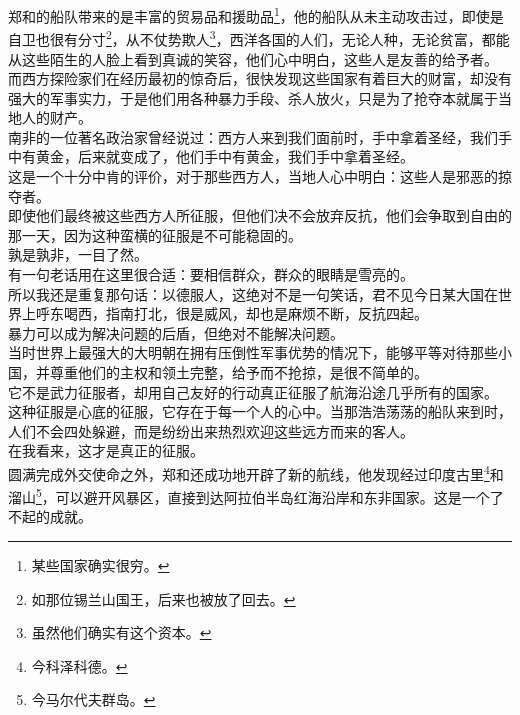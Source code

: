\begin{multicols}{\theparacolNo}
郑和的船队带来的是丰富的贸易品和援助品\footnote{某些国家确实很穷。}，他的船队从未主动攻击过，即使是自卫也很有分寸\footnote{如那位锡兰山国王，后来也被放了回去。}，从不仗势欺人\footnote{虽然他们确实有这个资本。}，西洋各国的人们，无论人种，无论贫富，都能从这些陌生的人脸上看到真诚的笑容，他们心中明白，这些人是友善的给予者。\\

而西方探险家们在经历最初的惊奇后，很快发现这些国家有着巨大的财富，却没有强大的军事实力，于是他们用各种暴力手段、杀人放火，只是为了抢夺本就属于当地人的财产。\\

南非的一位著名政治家曾经说过：西方人来到我们面前时，手中拿着圣经，我们手中有黄金，后来就变成了，他们手中有黄金，我们手中拿着圣经。\\

这是一个十分中肯的评价，对于那些西方人，当地人心中明白：这些人是邪恶的掠夺者。\\

即使他们最终被这些西方人所征服，但他们决不会放弃反抗，他们会争取到自由的那一天，因为这种蛮横的征服是不可能稳固的。\\

孰是孰非，一目了然。\\

有一句老话用在这里很合适：要相信群众，群众的眼睛是雪亮的。\\

所以我还是重复那句话：以德服人，这绝对不是一句笑话，君不见今日某大国在世界上呼东喝西，指南打北，很是威风，却也是麻烦不断，反抗四起。\\

暴力可以成为解决问题的后盾，但绝对不能解决问题。\\

当时世界上最强大的大明朝在拥有压倒性军事优势的情况下，能够平等对待那些小国，并尊重他们的主权和领土完整，给予而不抢掠，是很不简单的。\\

它不是武力征服者，却用自己友好的行动真正征服了航海沿途几乎所有的国家。\\

这种征服是心底的征服，它存在于每一个人的心中。当那浩浩荡荡的船队来到时，人们不会四处躲避，而是纷纷出来热烈欢迎这些远方而来的客人。\\

在我看来，这才是真正的征服。\\

圆满完成外交使命之外，郑和还成功地开辟了新的航线，他发现经过印度古里\footnote{今科泽科德。}和溜山\footnote{今马尔代夫群岛。}，可以避开风暴区，直接到达阿拉伯半岛红海沿岸和东非国家。这是一个了不起的成就。\\


\end{multicols}
